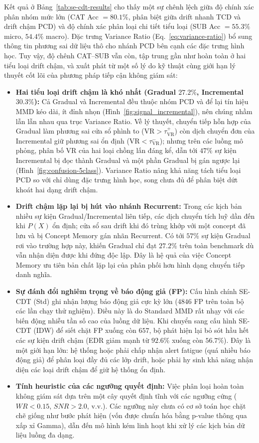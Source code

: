 Kết quả ở Bảng~\ref{tab:se-cdt-results} cho thấy một sự chênh lệch giữa độ chính xác phân nhóm mức lớn (CAT Acc $= 80.1\%$, phân biệt giữa drift nhanh TCD và drift chậm PCD) và độ chính xác phân loại chi tiết tiểu loại (SUB Acc $= 55.3\%$ micro, $54.4\%$ macro). Đặc trưng Variance Ratio (Eq.~\eqref{eq:variance-ratio}) bổ sung thông tin phương sai dữ liệu thô cho nhánh PCD bên cạnh các đặc trưng hình học. Tuy vậy, độ chênh CAT--SUB vẫn còn, tập trung gần như hoàn toàn ở hai tiểu loại drift chậm, và xuất phát từ một số lý do kỹ thuật cùng giới hạn lý thuyết cốt lõi của phương pháp tiếp cận không giám sát:
\begin{itemize}
	\item \textbf{Hai tiểu loại drift chậm là khó nhất (Gradual $27.2\%$, Incremental $30.3\%$):} Cả Gradual và Incremental đều thuộc nhóm PCD và để lại tín hiệu MMD kéo dài, ít đỉnh nhọn (Hình~\ref{fig:signal_incremental}), nên chúng nhầm lẫn lẫn nhau qua trục Variance Ratio. Về lý thuyết, chuyển tiếp hỗn hợp của Gradual làm phương sai cửa sổ phình to ($\mathrm{VR} > \tau_{\mathrm{VR}}^{+}$) còn dịch chuyển đơn của Incremental giữ phương sai ổn định ($\mathrm{VR} < \tau_{\mathrm{VR}}^{-}$); nhưng trên các luồng mô phỏng, phân bố VR của hai loại chồng lấn đáng kể, dẫn tới $47\%$ sự kiện Incremental bị đọc thành Gradual và một phần Gradual bị gán ngược lại (Hình~\ref{fig:confusion-5class}). Variance Ratio nâng khả năng tách tiểu loại PCD so với chỉ dùng đặc trưng hình học, song chưa đủ để phân biệt dứt khoát hai dạng drift chậm.
	\item \textbf{Drift chậm lặp lại bị hút vào nhánh Recurrent:} Trong các kịch bản nhiều sự kiện Gradual/Incremental liên tiếp, các dịch chuyển tích luỹ dần đến khi $P(X)$ ổn định; cửa sổ sau drift khi đó trùng khớp với một concept đã lưu và bị Concept Memory gán nhãn Recurrent. Có tới $57\%$ sự kiện Gradual rơi vào trường hợp này, khiến Gradual chỉ đạt $27.2\%$ trên toàn benchmark dù vẫn nhận diện được khi đứng độc lập. Đây là hệ quả của việc Concept Memory ưu tiên bản chất lặp lại của phân phối hơn hình dạng chuyển tiếp danh nghĩa.
	\item \textbf{Sự đánh đổi nghiêm trọng về báo động giả (FP):} Cấu hình chính SE-CDT (Std) ghi nhận lượng báo động giả cực kỳ lớn ($4846$ FP trên toàn bộ các lần chạy thử nghiệm). Điều này là do Standard MMD rất nhạy với các biến động nhiễu tần số cao của luồng dữ liệu. Khi chuyển sang cấu hình SE-CDT (IDW) để siết chặt FP xuống còn $657$, bộ phát hiện lại bỏ sót hầu hết các sự kiện drift chậm (EDR giảm mạnh từ $92.6\%$ xuống còn $56.7\%$). Đây là một giới hạn lớn: hệ thống hoặc phải chấp nhận alert fatigue (quá nhiều báo động giả) để phân loại đầy đủ các lớp drift, hoặc phải hy sinh khả năng nhận diện các loại drift chậm để giữ hệ thống ổn định.
	\item \textbf{Tính heuristic của các ngưỡng quyết định:} Việc phân loại hoàn toàn không giám sát dựa trên một cây quyết định tĩnh với các ngưỡng cứng ($WR < 0.15$, $SNR > 2.0$, v.v.). Các ngưỡng này chưa có cơ sở toán học chặt chẽ giống như bước phát hiện (vốn được chuẩn hóa bằng p-value thông qua xấp xỉ Gamma), dẫn đến mô hình kém linh hoạt khi xử lý các kịch bản dữ liệu luồng đa dạng.
\end{itemize}

